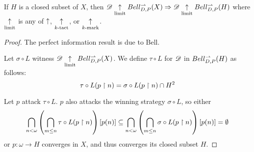 \begin{thm}
  If $H$ is a closed subset of $X$, then
    $
      \mathscr{D} \underset{\text{limit}}{\uparrow} Bell_{D,P}^{\rightharpoonup}(X)
        \Rightarrow
      \mathscr{D} \underset{\text{limit}}{\uparrow} Bell_{D,P}^{\rightharpoonup}(H)
    $
  where $\underset{\text{limit}}{\uparrow}$ is any of $\uparrow$, $\underset{k\text{-tact}}{\uparrow}$, or $\underset{k\text{-mark}}{\uparrow}$.
\end{thm}

\begin{proof}
  The perfect information result is due to Bell.

  Let $\sigma\circ L$ witness $\mathscr{D} \underset{\text{limit}}{\uparrow} Bell_{D,P}^{\rightharpoonup}(X)$. We define
  $\tau\circ L$ for $\mathscr{D}$ in $Bell_{D,P}^{\rightharpoonup}(H)$ as follows:
    \[
      \tau\circ L(p\restriction n)
        =
      \sigma\circ L(p\restriction n)
        \cap
      H^2
    \]

  Let $p$ attack $\tau\circ L$. $p$ also attacks the winning strategy
  $\sigma\circ L$, so either
    \[
      \bigcap_{n<\omega}
      \left(\bigcap_{m\leq n}\tau\circ L(p\restriction n)\right)
      [p(n)]
        \subseteq
      \bigcap_{n<\omega}
      \left(\bigcap_{m\leq n}\sigma\circ L(p\restriction n)\right)
      [p(n)]
        =
      \emptyset
    \]
  or $p:\omega\to H$ converges in $X$, and thus converges its closed subset
  $H$.
\end{proof}








